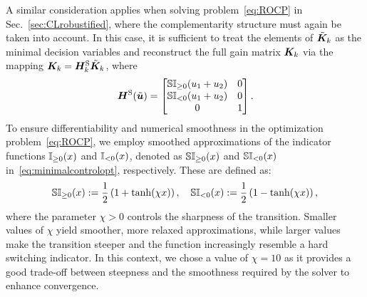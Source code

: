 A similar consideration applies when solving problem~\eqref{eq:ROCP} in Sec.~\ref{sec:CLrobustified}, where the complementarity structure must again be taken into account. In this case, it is sufficient to treat the elements of $\tilde{\boldsymbol{K}}_k$ as the minimal decision variables and reconstruct the full gain matrix $\boldsymbol{K}_k$ via the mapping $\boldsymbol{K}_k = \boldsymbol{H}_k^{\text{S}} \tilde{\boldsymbol{K}}_k$, where
\begin{equation} \label{eq:minimalcontrolopt}
\bH^{\text{S}}(\tilde{\bu}) =
\begin{bmatrix}
\SIpos{u_1+u_2} & 0 \\
\SIneg{u_1+u_2} & 0 \\
0 & 1
\end{bmatrix}. 
\end{equation}
To ensure differentiability and numerical smoothness in the optimization problem~\eqref{eq:ROCP}, we employ smoothed approximations of the indicator functions $\mathbb{I}_{\geq 0}(x)$ and $\mathbb{I}_{< 0}(x)$, denoted as $\mathbb{SI}_{\geq 0}(x)$ and $\mathbb{SI}_{ < 0}(x)$ in~\eqref{eq:minimalcontrolopt}, respectively. These are defined as:
\begin{equation} \label{eq:smoothedindicator}
\SIpos{x} :=
\frac{1}{2} \left(1 + \tanh(\chi x)\right), \quad \SIneg{x} := \frac{1}{2}\left(1 - \tanh(\chi x) \right),
\end{equation}
where the parameter $\chi>0$ controls the sharpness of the transition. Smaller values of $\chi$ yield smoother, more relaxed approximations, while larger values make the transition steeper and the function increasingly resemble a hard switching indicator.
In this context, we chose a value of $\chi=10$ as it provides a good trade-off between steepness and the smoothness required by the solver to enhance convergence.  
